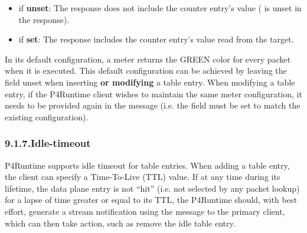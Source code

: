 \documentclass[11pt]{article}
\begin{document}
{\begin{itemize}
\begin{itemize}[noitemsep,topsep=\mdcompacttopsep]
\begin{itemize}[noitemsep,topsep=\mdcompacttopsep]
\item{}if \textbf{unset}: The response does not include the counter entry's value
( is unset in the response).%

\item{}if \textbf{set}: The response includes the counter entry's value read from
the target.%
\end{itemize}%
\end{itemize}%
\end{itemize}%

\noindent{}In its default configuration, a meter returns the GREEN color for every packet
when it is executed. This default configuration can be achieved by leaving the
 field unset when inserting \textbf{or modifying} a table entry. When
modifying a table entry, if the P4Runtime client wishes to maintain the same
meter configuration, it needs to be provided again in the  message
(i.e. the  field must be set to match the existing configuration).%

\subsubsection{9.1.7.\hspace*{0.5em}Idle-timeout}\label{sec-idle-timeout}%

\noindent{}P4Runtime supports idle timeout for table entries. When adding a table entry,
the client can specify a Time-To-Live (TTL) value. If at any time during its
lifetime, the data plane entry is not \textquotedblleft{}hit\textquotedblright{} (i.e. not selected by any packet
lookup) for a lapse of time greater or equal to its TTL, the P4Runtime should,
with best effort, generate a stream notification \textemdash{} using the
 message \textemdash{} to the primary client, which can then take
action, such as remove the idle table entry.%

}
\end{document}
